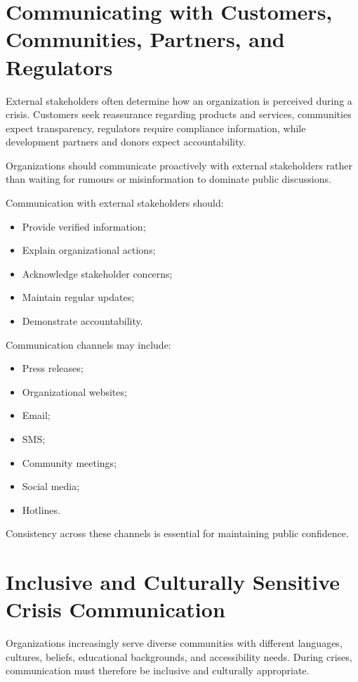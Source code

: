 \documentclass[10pt]{article}
\begin{document}
\section*{Communicating with Customers, Communities, Partners, and Regulators}

External stakeholders often determine how an organization is perceived during a crisis. Customers seek reassurance regarding products and services, communities expect transparency, regulators require compliance information, while development partners and donors expect accountability.

Organizations should communicate proactively with external stakeholders rather than waiting for rumours or misinformation to dominate public discussions.

Communication with external stakeholders should:
\begin{itemize}
    \item Provide verified information;
    \item Explain organizational actions;
    \item Acknowledge stakeholder concerns;
    \item Maintain regular updates;
    \item Demonstrate accountability.
\end{itemize}

Communication channels may include:
\begin{itemize}
    \item Press releases;
    \item Organizational websites;
    \item Email;
    \item SMS;
    \item Community meetings;
    \item Social media;
    \item Hotlines.
\end{itemize}

Consistency across these channels is essential for maintaining public confidence.

\section*{Inclusive and Culturally Sensitive Crisis Communication}

Organizations increasingly serve diverse communities with different languages, cultures, beliefs, educational backgrounds, and accessibility needs. During crises, communication must therefore be inclusive and culturally appropriate.
\end{document}
